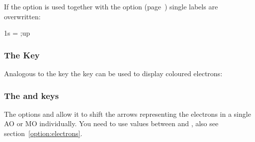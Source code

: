 \documentclass[load-preamble+]{cnltx-doc}
\begin{document}
If the option is used together with the  option
(page~\pageref{option:labels}) single labels are overwritten:
\begin{example}
  \begin{MOdiagram}[labels]
     { 1s = {;up} }
  \end{MOdiagram}
\end{example}

\subsubsection{The  Key}\label{sec:key:color}
Analogous to the  key the  key can be used to
display coloured electrons:
\begin{example}
  \begin{MOdiagram}[labels-fs=\footnotesize]
  \end{MOdiagram}
\end{example}

\subsubsection{The  and  keys}\label{sec:key:electrons}
The options  and  allow it to shift the
arrows representing the electrons in a single \ac{AO} or \ac{MO} individually.
You need to use values between  and , also see
section~\ref{option:electrons}.
\begin{example}
  \begin{MOdiagram}
  \end{MOdiagram}
\end{example}
\end{document}
